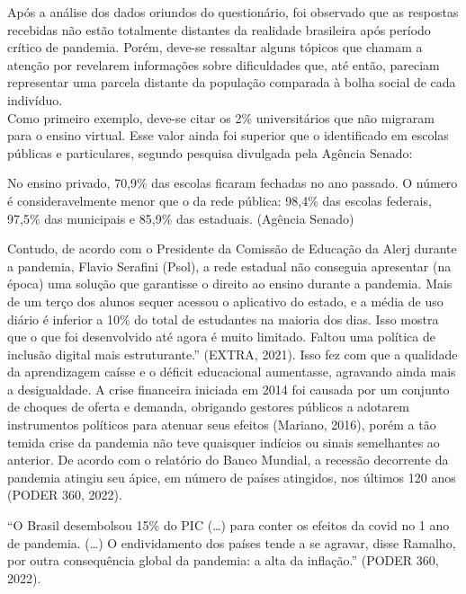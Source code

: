 \documentclass[
]{article}
\begin{document}
Após a análise dos dados oriundos do questionário, foi observado que as
respostas recebidas não estão totalmente distantes da realidade
brasileira após período crítico de pandemia. Porém, deve-se ressaltar
alguns tópicos que chamam a atenção por revelarem informações sobre
dificuldades que, até então, pareciam representar uma parcela distante
da população comparada à bolha social de cada indivíduo.\\
Como primeiro exemplo, deve-se citar os 2\% universitários que não
migraram para o ensino virtual. Esse valor ainda foi superior que o
identificado em escolas públicas e particulares, segundo pesquisa
divulgada pela Agência Senado:

No ensino privado, 70,9\% das escolas ficaram fechadas no ano passado. O
número é consideravelmente menor que o da rede pública: 98,4\% das
escolas federais, 97,5\% das municipais e 85,9\% das estaduais. (Agência
Senado)

Contudo, de acordo com o Presidente da Comissão de Educação da Alerj
durante a pandemia, Flavio Serafini (Psol), a rede estadual não
conseguia apresentar (na época) uma solução que garantisse o direito ao
ensino durante a pandemia. Mais de um terço dos alunos sequer acessou o
aplicativo do estado, e a média de uso diário é inferior a 10\% do total
de estudantes na maioria dos dias. Isso mostra que o que foi
desenvolvido até agora é muito limitado. Faltou uma política de inclusão
digital mais estruturante.'' (EXTRA, 2021). Isso fez com que a qualidade
da aprendizagem caísse e o déficit educacional aumentasse, agravando
ainda mais a desigualdade. A crise financeira iniciada em 2014 foi
causada por um conjunto de choques de oferta e demanda, obrigando
gestores públicos a adotarem instrumentos políticos para atenuar seus
efeitos (Mariano, 2016), porém a tão temida crise da pandemia não teve
quaisquer indícios ou sinais semelhantes ao anterior. De acordo com o
relatório do Banco Mundial, a recessão decorrente da pandemia atingiu
seu ápice, em número de países atingidos, nos últimos 120 anos (PODER
360, 2022).

``O Brasil desembolsou 15\% do PIC (\ldots) para conter os efeitos da
covid no 1 ano de pandemia. (\ldots) O endividamento dos países tende a
se agravar, disse Ramalho, por outra consequência global da pandemia: a
alta da inflação.'' (PODER 360, 2022).
\end{document}
